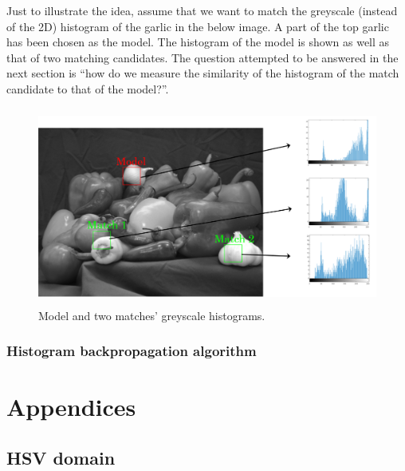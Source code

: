 \documentclass[a4paper]{article}
\begin{document}
Just to illustrate the idea, assume that we want to match the greyscale (instead of the 2D) histogram of the garlic in the below image. A part of the top garlic has been chosen as the model. The histogram of the model is shown as well as that of two matching candidates. The question attempted to be answered in the next section is ``how do we measure the similarity of the histogram of the match candidate to that of the model?''.

\begin{figure}[H]
    \centering
    \includegraphics[height=6.5cm]{img/image_hist_different_regions.png}
    \caption{Model and two matches' greyscale histograms.}
\end{figure}


\subsubsection{Histogram backpropagation algorithm}






\newpage
\appendix

\section{Appendices}

\newpage
\subsection{HSV domain}
\label{app:hsv_domain}
\end{document}

